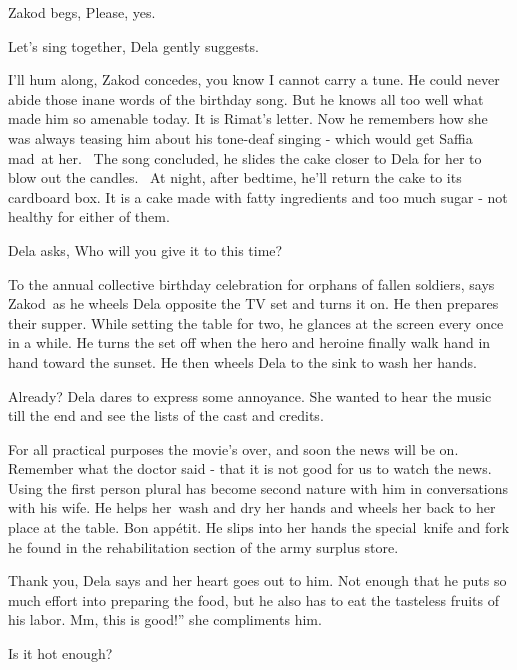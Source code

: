\documentclass[letterpaper]{article}
\begin{document}
Zakod begs, {\textquotedbl}Please, yes.{\textquotedbl} 

{\textquotedbl}Let's sing together,{\textquotedbl} Dela gently suggests. 

{\textquotedbl}I'll hum along,{\textquotedbl} Zakod concedes, {\textquotedbl}you know I cannot carry a
tune.{\textquotedbl} He could never abide those inane words of the birthday song. But he knows all too well what made
him so amenable today. It is Rimat's letter. Now he remembers how she was always teasing him about his tone-deaf
singing - which would get Saffia mad\ at her. \ The song concluded, he slides the cake closer to Dela for her to blow
out the candles. \ At night, after bedtime, he'll return the cake to its cardboard box. It is a cake made with fatty
ingredients and too much sugar - not healthy for either of them.

Dela asks, {\textquotedbl}Who will you give it to this time?{\textquotedbl} 

{\textquotedbl}To the annual collective birthday celebration for orphans of fallen soldiers,{\textquotedbl} says
Zakod~as he wheels Dela opposite the TV set and turns it on. He then prepares their supper. While setting the table for
two, he glances at the screen every once in a while. He turns the set off when the hero and heroine finally walk hand
in hand toward the sunset. He then wheels Dela to the sink to wash her hands.\ \ 

{\textquotedbl}Already?{\textquotedbl} Dela dares to express some annoyance. She wanted to hear the music till the end
and see the lists of the cast and credits. 

{\textquotedbl}For all practical purposes the movie's over, and soon the news will be on. Remember what the doctor said
- that it is not good for us to watch the news.{\textquotedbl} Using the first person plural has become second nature
with him in conversations with his wife. He helps her~wash and dry her hands and wheels her back to her place at the
table. {\textquotedbl}Bon app\'etit.{\textquotedbl} He slips into her hands the special~knife and fork he found in the
rehabilitation section of the army surplus store. 

{\textquotedbl}Thank you,{\textquotedbl} Dela says and her heart goes out to him. Not enough that he puts so much effort
into preparing the food, but he also has to eat the tasteless fruits of his labor. {\textquotedbl}Mm, this is good!''
she compliments him. 

{\textquotedbl}Is it hot enough?{\textquotedbl} 
\end{document}
